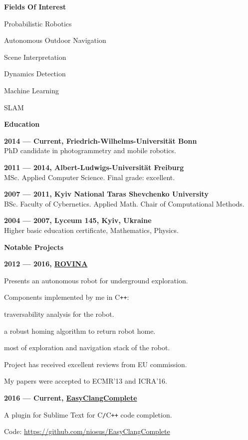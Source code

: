 \documentclass[a4paper,12pt,final]{memoir}
\newcommand{\SmallSep}{\vspace{0.5em}}
\newcommand{\CVSection}[1]
	{\Large\textbf{#1}\par
	\SmallSep\normalsize\normalfont}
\newcommand{\CVItem}[1]
	{\textbf{\color{MidnightBlue} #1}}
\begin{document}
	\CVSection{Fields Of Interest}
	\begin{compactitem}[\color{MidnightBlue}$\circ$]
		\item Probabilistic Robotics
		\item Autonomous Outdoor Navigation
		\item Scene Interpretation
		\item Dynamics Detection
		\item Machine Learning
		\item SLAM
	\end{compactitem}
	\SmallSep

\vfill
\framebreak{}

\CVSection{Education}
\CVItem{2014 --- Current, Friedrich-Wilhelms-Universit\"at Bonn}\\
PhD candidate in photogrammetry and mobile robotics.
\SmallSep{}

\CVItem{2011 --- 2014, Albert-Ludwigs-Universit\"at Freiburg}\\
MSc. Applied Computer Science. Final grade: excellent.
\SmallSep{}

\CVItem{2007 --- 2011, Kyiv National Taras Shevchenko University}\\
BSc. Faculty of Cybernetics. Applied Math.
\newline Chair of Computational Methods.
\SmallSep{}

\CVItem{2004 --- 2007, Lyceum 145, Kyiv, Ukraine}\\
Higher basic education certificate, Mathematics, Physics.
\SmallSep{}


\CVSection{Notable Projects}
\CVItem{2012 --- 2016, \href{http://www.rovina-project.eu/}{ROVINA}}
\begin{compactitem}[\color{MidnightBlue}$\circ$]
	\item Presents an autonomous robot for underground exploration.
	\item Components implemented by me in C\texttt{++}:
	\begin{compactitem}[\color{MidnightBlue}$-$]
	 	\item traversability analysis for the robot.
	 	\item a robust homing algorithm to return robot home.
		\item most of exploration and navigation stack of the robot.
	 \end{compactitem}
	\item Project has received excellent reviews from EU commission.
	\item My papers were accepted to ECMR'13 and ICRA'16.
\end{compactitem}
\CVItem{2016 --- Current, \href{https://github.com/niosus/EasyClangComplete}{EasyClangComplete}}
\begin{compactitem}[\color{MidnightBlue}$\circ$]
	\item A plugin for Sublime Text for C\texttt{/}C\texttt{++} code completion.
	\item Code: \href{https://github.com/niosus/EasyClangComplete}{https://github.com/niosus/EasyClangComplete}
\end{compactitem}
\SmallSep
\end{document}
